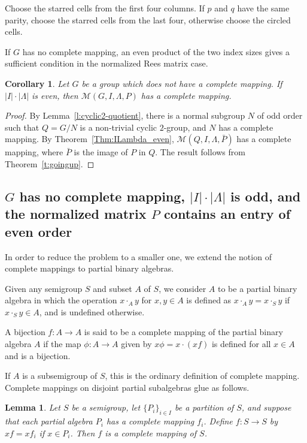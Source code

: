 \documentclass[11pt]{article}
\theoremstyle{plain}
\newtheorem{lemma}[theorem]{Lemma}
\newtheorem{cor}[theorem]{Corollary}
\theoremstyle{remark}
\theoremstyle{definition}
\theoremstyle{plain}
\begin{document}
Choose the starred cells from the first four columns. If $p$ and $q$ have the same parity, choose the starred cells from the last four, otherwise choose the circled cells.

If $G$ has no complete mapping, an even product of the two index sizes gives a sufficient condition in the normalized Rees matrix case.

\begin{cor}\label{c:even}
Let $G$ be a group which does not have a complete mapping. If
$|I|\cdot|\Lambda|$ is even, then $\mathcal{M}(G,I,\Lambda,P)$ has a complete mapping.
\end{cor}
\begin{proof}
By Lemma~\ref{l:cyclic2-quotient}, there is a normal subgroup $N$ of odd order
such that $Q=G/N$ is a non-trivial cyclic $2$-group, and $N$ has a complete
mapping. By Theorem~\ref{Thm:ILambda_even},
$\mathcal{M}(Q,I,\Lambda,\bar P)$ has a complete mapping, where $\bar P$ is
the image of $P$ in $Q$. The result follows from Theorem~\ref{t:goingup}.
\end{proof}

\subsection[Rees matrix semigroups: odd index product with even-order entry]{$G$ has no complete mapping, $|I|\cdot|\Lambda|$ is odd, and the normalized matrix $P$ contains an entry of even order}

In order to reduce the problem to a smaller one, we extend the notion of complete mappings to partial binary algebras.

Given any semigroup $S$ and subset $A$ of $S$, we consider $A$ to be a partial binary algebra in which the operation $x \cdot_A y$ for $x,y \in A$ is defined as $x \cdot_A y=x \cdot_S y$ if $x \cdot_S y \in A$, and is undefined otherwise.

A bijection $f\colon A\to A$ is said to be a complete mapping of the partial binary algebra $A$ if the map $\phi\colon A\to A$ given by $x\phi=x\cdot (xf)$ is defined for all $x\in A$ and is a bijection.

If $A$ is a subsemigroup of $S$, this is the ordinary definition of complete mapping. Complete mappings on disjoint partial subalgebras glue as follows.

\begin{lemma}\label{l:partition}
Let $S$ be a semigroup, let $\{P_i\}_{i\in I}$ be a partition of $S$, and suppose that each partial algebra $P_i$ has a complete mapping $f_i$. Define $f\colon S\to S$ by $xf=xf_i$ if $x \in P_i$. Then $f$ is a complete mapping of $S$.
\end{lemma}
\end{document}
